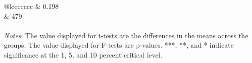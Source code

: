 \begin{tabular}{@{\extracolsep{5pt}}lccccccc}
\hline
{} &     0.198 \\
 &       479 \\
\hline \hline \\[-1.8ex]
{\textit{Notes}:  The value displayed for t-tests are the differences in the means across the groups. The value displayed for F-tests are p-values. ***, **, and * indicate significance at the 1, 5, and 10 percent critical level. }
\end{tabular}
